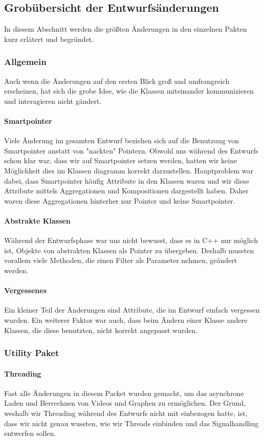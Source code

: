 \documentclass{scrartcl}
\begin{document}
{\subsection{Grobübersicht der Entwurfsänderungen}
In diesem Abschnitt werden die größten Änderungen in den einzelnen Pakten kurz erlätert und begründet.
\subsubsection{Allgemein}
Auch wenn die Änderungen auf den ersten Blick groß und umfrangreich erscheinen, hat sich die grobe Idee, wie die Klassen miteinander kommunizieren und interagieren nicht gändert.
\paragraph{Smartpointer} Viele Änderung im gesamten Entwurf beziehen sich auf die Benutzung von Smartpointer anstatt von "nackten" Pointern. Obwohl uns während des Entwurfs schon klar war, dass wir auf Smartpointer setzen werden, hatten wir keine Möglichkeit dies im Klassen diagramm korrekt darzustellen. Hauptproblem war dabei, dass Smartpointer häufig Attribute in den Klassen waren und wir diese Attribute mittels Aggregationen und Kompositionen dargestellt haben. Daher waren diese Aggregationen hinterher nur Pointer und keine Smartpointer.
\paragraph{Abstrakte Klassen} Während der Entwurfsphase war uns nicht bewusst, dass es in C++ nur möglich ist, Objekte von abstrakten Klassen als Pointer zu übergeben. Deshalb mussten vorallem viele Methoden, die einen Filter als Parameter nehmen, geändert werden.
\paragraph{Vergessenes} Ein kleiner Teil der Änderungen sind Attribute, die im Entwurf einfach vergessen wurden. Ein weiterer Faktor war auch, dass beim Ändern einer Klasse andere Klassen, die diese benutzten, nicht korrekt angepasst wurden.
\bigskip
\subsubsection{Utility Paket}
\paragraph{Threading}
Fast alle Änderungen in diesem Packet wurden gemacht, um das  asynchrone Laden und Berrechnen von Videos und Graphen zu ermöglichen. Der Grund, weshalb wir Threading während des Entwurfs nicht mit einbezogen hatte, ist, dass wir nicht genau wussten, wie wir Threads einbinden und das Signalhandling entwerfen sollen.
\bigskip
}
\end{document}
